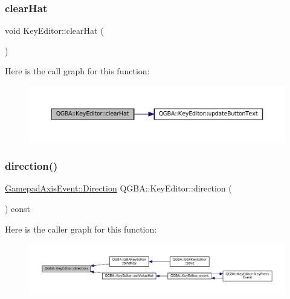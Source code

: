 \subsubsection{\texorpdfstring{clear\+Hat}{clearHat}}
{\footnotesize\ttfamily void Key\+Editor\+::clear\+Hat (\begin{DoxyParamCaption}{ }\end{DoxyParamCaption})\hspace{0.3cm}{\ttfamily [slot]}}

Here is the call graph for this function\+:
\nopagebreak
\begin{figure}[H]
\begin{center}
\leavevmode
\includegraphics[width=350pt]{class_q_g_b_a_1_1_key_editor_ab9b54608647abd9e963cf725910d6038_cgraph}
\end{center}
\end{figure}
\mbox{\label{class_q_g_b_a_1_1_key_editor_ad25269e1dcdc079722604aa156cece1b}} 
\subsubsection{\texorpdfstring{direction()}{direction()}}
{\footnotesize\ttfamily \mbox{\hyperlink{class_q_g_b_a_1_1_gamepad_axis_event_a5d50ab74dce4e58252f2affb5f227bbc}{Gamepad\+Axis\+Event\+::\+Direction}} Q\+G\+B\+A\+::\+Key\+Editor\+::direction (\begin{DoxyParamCaption}{ }\end{DoxyParamCaption}) const\hspace{0.3cm}{\ttfamily [inline]}}

Here is the caller graph for this function\+:
\nopagebreak
\begin{figure}[H]
\begin{center}
\leavevmode
\includegraphics[width=350pt]{class_q_g_b_a_1_1_key_editor_ad25269e1dcdc079722604aa156cece1b_icgraph}
\end{center}
\end{figure}
\mbox{\label{class_q_g_b_a_1_1_key_editor_ac685742decd6c4140c00110fb1abaca5}} 
